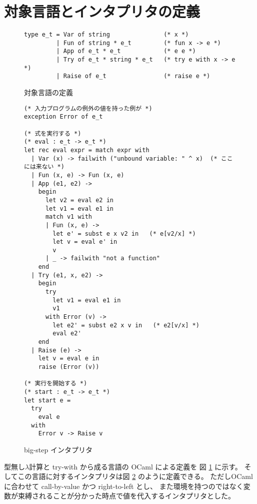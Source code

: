  \section{対象言語とインタプリタの定義}
\label{section:try-with__interpreter}

\begin{figure}
\begin{spacing}{0.8}
\begin{verbatim}
type e_t = Var of string               (* x *)
         | Fun of string * e_t         (* fun x -> e *)
         | App of e_t * e_t            (* e e *)
         | Try of e_t * string * e_t   (* try e with x -> e *)
         | Raise of e_t                (* raise e *)
\end{verbatim}
\end{spacing}
\caption{対象言語の定義}
\label{figure:typee}
\end{figure}

\begin{figure}
\begin{spacing}{0.8}
\begin{verbatim}
(* 入力プログラムの例外の値を持った例が *)
exception Error of e_t

(* 式を実行する *)
(* eval : e_t -> e_t *)
let rec eval expr = match expr with
  | Var (x) -> failwith ("unbound variable: " ^ x)  (* ここには来ない *)
  | Fun (x, e) -> Fun (x, e)
  | App (e1, e2) ->
    begin
      let v2 = eval e2 in
      let v1 = eval e1 in
      match v1 with
      | Fun (x, e) ->
        let e' = subst e x v2 in   (* e[v2/x] *)
        let v = eval e' in
        v
      | _ -> failwith "not a function"
    end
  | Try (e1, x, e2) ->
    begin
      try
        let v1 = eval e1 in
        v1
      with Error (v) ->
        let e2' = subst e2 x v in   (* e2[v/x] *)
        eval e2'
    end
  | Raise (e) ->
    let v = eval e in
    raise (Error (v))

(* 実行を開始する *)
(* start : e_t -> e_t *)
let start e =
  try
    eval e
  with
    Error v -> Raise v
\end{verbatim}
\end{spacing}
\caption{big-step インタプリタ}
\label{figure:interpreter}
\end{figure}


型無し$\lambda$計算と try-with から成る言語の OCaml による定義を
図 \ref{figure:typee} に示す。
そしてこの言語に対するインタプリタは図 \ref{figure:interpreter} のように定義できる。
ただしOCaml に合わせて call-by-value かつ right-to-left とし、
また環境を持つのではなく変数が束縛されることが分かった時点で値を代入するインタプリタとした。

